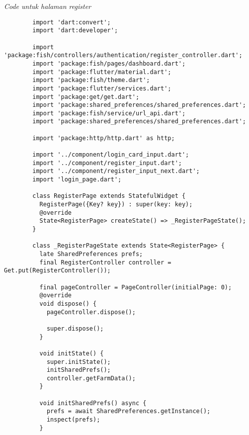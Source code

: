 	\textit{Code untuk halaman register}
	\begin{lstlisting}
        import 'dart:convert';
        import 'dart:developer';
        
        import 'package:fish/controllers/authentication/register_controller.dart';
        import 'package:fish/pages/dashboard.dart';
        import 'package:flutter/material.dart';
        import 'package:fish/theme.dart';
        import 'package:flutter/services.dart';
        import 'package:get/get.dart';
        import 'package:shared_preferences/shared_preferences.dart';
        import 'package:fish/service/url_api.dart';
        import 'package:shared_preferences/shared_preferences.dart';
        
        import 'package:http/http.dart' as http;
        
        import '../component/login_card_input.dart';
        import '../component/register_input.dart';
        import '../component/register_input_next.dart';
        import 'login_page.dart';
        
        class RegisterPage extends StatefulWidget {
          RegisterPage({Key? key}) : super(key: key);
          @override
          State<RegisterPage> createState() => _RegisterPageState();
        }
        
        class _RegisterPageState extends State<RegisterPage> {
          late SharedPreferences prefs;
          final RegisterController controller = Get.put(RegisterController());
        
          final pageController = PageController(initialPage: 0);
          @override
          void dispose() {
            pageController.dispose();
        
            super.dispose();
          }
        
          void initState() {
            super.initState();
            initSharedPrefs();
            controller.getFarmData();
          }
        
          void initSharedPrefs() async {
            prefs = await SharedPreferences.getInstance();
            inspect(prefs);
          }
        

\end{lstlisting}
